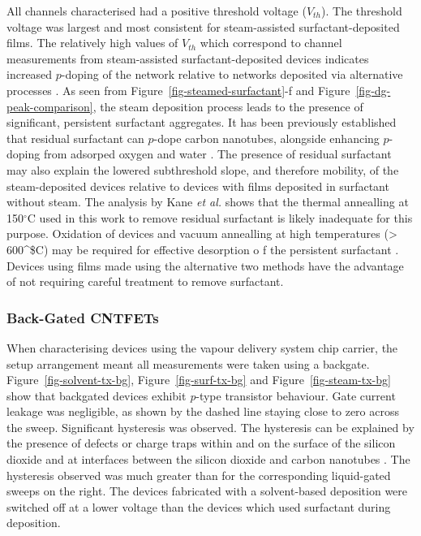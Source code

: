 \documentclass[
  a4paper,
]{scrbook}
\begin{document}
All channels characterised had a positive threshold voltage
(\(V_{th}\)). The threshold voltage was largest and most consistent for
steam-assisted surfactant-deposited films. The relatively high values of
\(V_{th}\) which correspond to channel measurements from steam-assisted
surfactant-deposited devices indicates increased \(p\)-doping of the
network relative to networks deposited via alternative processes
\autocite{Kang2005,Heller2008,Murugathas2018}. As seen from
Figure~\ref{fig-steamed-surfactant}-f and
Figure~\ref{fig-dg-peak-comparison}, the steam deposition process leads
to the presence of significant, persistent surfactant aggregates. It has
been previously established that residual surfactant can \(p\)-dope
carbon nanotubes, alongside enhancing \(p\)-doping from adsorped oxygen
and water \autocite{Kane2014,Nonoguchi2018,Christensen2022}. The
presence of residual surfactant may also explain the lowered
subthreshold slope, and therefore mobility, of the steam-deposited
devices relative to devices with films deposited in surfactant without
steam. The analysis by Kane \emph{et al.} shows that the thermal
annealling at 150\(^\circ\)C used in this work to remove residual
surfactant is likely inadequate for this purpose. Oxidation of devices
and vacuum annealling at high temperatures (\textgreater{}
600\^{}\circ\$C) may be required for effective desorption o f the
persistent surfactant \autocite{Kane2014,Barnett2018}. Devices using
films made using the alternative two methods have the advantage of not
requiring careful treatment to remove surfactant.

\hypertarget{back-gated-cntfets}{%
\subsubsection*{Back-Gated CNTFETs}\label{back-gated-cntfets}}

When characterising devices using the vapour delivery system chip
carrier, the setup arrangement meant all measurements were taken using a
backgate. Figure~\ref{fig-solvent-tx-bg}, Figure~\ref{fig-surf-tx-bg}
and Figure~\ref{fig-steam-tx-bg} show that backgated devices exhibit
\emph{p}-type transistor behaviour. Gate current leakage was negligible,
as shown by the dashed line staying close to zero across the sweep.
Significant hysteresis was observed. The hysteresis can be explained by
the presence of defects or charge traps within and on the surface of the
silicon dioxide and at interfaces between the silicon dioxide and carbon
nanotubes \autocite{Lee2007,Lee2012,Ha2014}. The hysteresis observed was
much greater than for the corresponding liquid-gated sweeps on the
right. The devices fabricated with a solvent-based deposition were
switched off at a lower voltage than the devices which used surfactant
during deposition.
\end{document}
